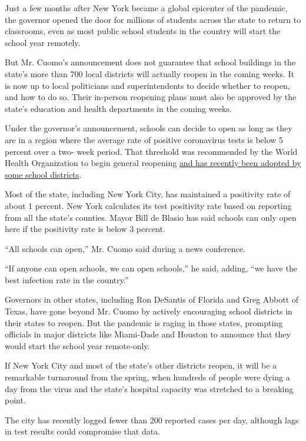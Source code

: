 Just a few months after New York became a global epicenter of the
pandemic, the governor opened the door for millions of students across
the state to return to classrooms, even as most public school students
in the country will start the school year remotely.

But Mr. Cuomo's announcement does not guarantee that school buildings in
the state's more than 700 local districts will actually reopen in the
coming weeks. It is now up to local politicians and superintendents to
decide whether to reopen, and how to do so. Their in-person reopening
plans must also be approved by the state's education and health
departments in the coming weeks.

Under the governor's announcement, schools can decide to open as long as
they are in a region where the average rate of positive coronavirus
tests is below 5 percent over a two- week period. That threshold was
recommended by the World Health Organization to begin general reopening
\href{https://www.nytimes3xbfgragh.onion/2020/07/14/us/coronavirus-schools-fall.html}{and
has recently been adopted by some school districts}.

Most of the state, including New York City, has maintained a positivity
rate of about 1 percent. New York calculates its test positivity rate
based on reporting from all the state's counties. Mayor Bill de Blasio
has said schools can only open here if the positivity rate is below 3
percent.

``All schools can open,'' Mr. Cuomo said during a news conference.

``If anyone can open schools, we can open schools,'' he said, adding,
``we have the best infection rate in the country.''

Governors in other states, including Ron DeSantis of Florida and Greg
Abbott of Texas, have gone beyond Mr. Cuomo by actively encouraging
school districts in their states to reopen. But the pandemic is raging
in those states, prompting officials in major districts like Miami-Dade
and Houston to announce that they would start the school year
remote-only.

If New York City and most of the state's other districts reopen, it will
be a remarkable turnaround from the spring, when hundreds of people were
dying a day from the virus and the state's hospital capacity was
stretched to a breaking point.

The city has recently logged fewer than 200 reported cases per day,
although lags in test results could compromise that data.

